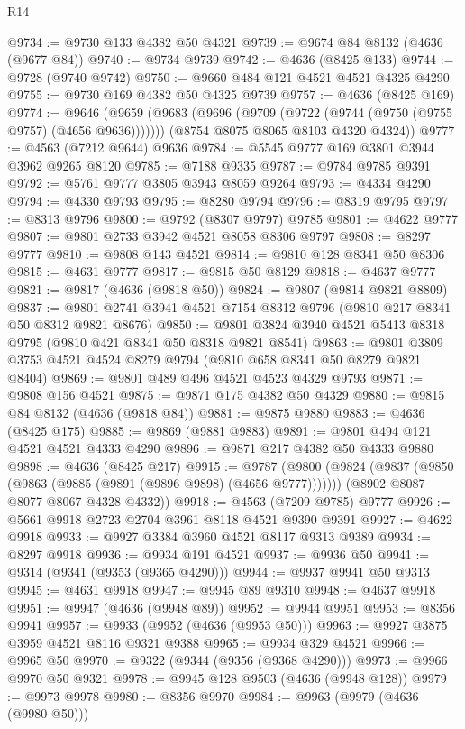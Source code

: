 \begin{lexlean}{R14}
\begin{coremodule}
@9734 := @9730 @133 @4382 @50 @4321
@9739 := @9674 @84 @8132 (@4636 (@9677 @84))
@9740 := @9734 @9739
@9742 := @4636 (@8425 @133)
@9744 := @9728 (@9740 @9742)
@9750 := @9660 @484 @121 @4521 @4521 @4325 @4290
@9755 := @9730 @169 @4382 @50 @4325 @9739
@9757 := @4636 (@8425 @169)
@9774 := @9646
    (@9659
      (@9683 (@9696 (@9709 (@9722 (@9744 (@9750 (@9755 @9757) (@4656 @9636)))))))
      (@8754 @8075 @8065 @8103 @4320 @4324))
@9777 := @4563 (@7212 @9644) @9636
@9784 := @5545 @9777 @169 @3801 @3944 @3962 @9265 @8120
@9785 := @7188 @9335
@9787 := @9784 @9785 @9391
@9792 := @5761 @9777 @3805 @3943 @8059 @9264
@9793 := @4334 @4290
@9794 := @4330 @9793
@9795 := @8280 @9794
@9796 := @8319 @9795
@9797 := @8313 @9796
@9800 := @9792 (@8307 @9797) @9785
@9801 := @4622 @9777
@9807 := @9801 @2733 @3942 @4521 @8058 @8306 @9797
@9808 := @8297 @9777
@9810 := @9808 @143 @4521
@9814 := @9810 @128 @8341 @50 @8306
@9815 := @4631 @9777
@9817 := @9815 @50 @8129
@9818 := @4637 @9777
@9821 := @9817 (@4636 (@9818 @50))
@9824 := @9807 (@9814 @9821 @8809)
@9837 := @9801 @2741 @3941 @4521 @7154 @8312 @9796 (@9810 @217 @8341 @50 @8312 @9821 @8676)
@9850 := @9801 @3824 @3940 @4521 @5413 @8318 @9795 (@9810 @421 @8341 @50 @8318 @9821 @8541)
@9863 := @9801 @3809 @3753 @4521 @4524 @8279 @9794 (@9810 @658 @8341 @50 @8279 @9821 @8404)
@9869 := @9801 @489 @496 @4521 @4523 @4329 @9793
@9871 := @9808 @156 @4521
@9875 := @9871 @175 @4382 @50 @4329
@9880 := @9815 @84 @8132 (@4636 (@9818 @84))
@9881 := @9875 @9880
@9883 := @4636 (@8425 @175)
@9885 := @9869 (@9881 @9883)
@9891 := @9801 @494 @121 @4521 @4521 @4333 @4290
@9896 := @9871 @217 @4382 @50 @4333 @9880
@9898 := @4636 (@8425 @217)
@9915 := @9787
    (@9800
      (@9824 (@9837 (@9850 (@9863 (@9885 (@9891 (@9896 @9898) (@4656 @9777)))))))
      (@8902 @8087 @8077 @8067 @4328 @4332))
@9918 := @4563 (@7209 @9785) @9777
@9926 := @5661 @9918 @2723 @2704 @3961 @8118 @4521 @9390 @9391
@9927 := @4622 @9918
@9933 := @9927 @3384 @3960 @4521 @8117 @9313 @9389
@9934 := @8297 @9918
@9936 := @9934 @191 @4521
@9937 := @9936 @50
@9941 := @9314 (@9341 (@9353 (@9365 @4290)))
@9944 := @9937 @9941 @50 @9313
@9945 := @4631 @9918
@9947 := @9945 @89 @9310
@9948 := @4637 @9918
@9951 := @9947 (@4636 (@9948 @89))
@9952 := @9944 @9951
@9953 := @8356 @9941
@9957 := @9933 (@9952 (@4636 (@9953 @50)))
@9963 := @9927 @3875 @3959 @4521 @8116 @9321 @9388
@9965 := @9934 @329 @4521
@9966 := @9965 @50
@9970 := @9322 (@9344 (@9356 (@9368 @4290)))
@9973 := @9966 @9970 @50 @9321
@9978 := @9945 @128 @9503 (@4636 (@9948 @128))
@9979 := @9973 @9978
@9980 := @8356 @9970
@9984 := @9963 (@9979 (@4636 (@9980 @50)))

\end{coremodule}
\end{lexlean}
